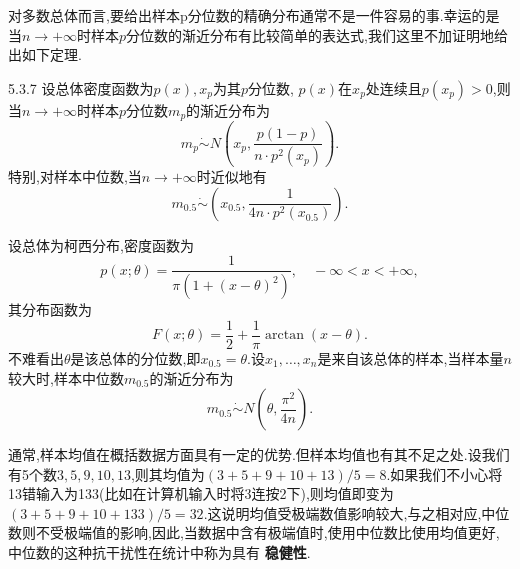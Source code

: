 对多数总体而言,要给出样本p分位数的精确分布通常不是一件容易的事.幸运的是当$n\to+\infty$时样本$p$分位数的渐近分布有比较简单的表达式,我们这里不加证明地给出如下定理.
\begin{theorem}{}{5.3.7}
设总体密度函数为$p(x),x_p$为其$p$分位数, $p(x)$在$x_p$处连续且$p(x_p)>0$,则当$n\to+\infty$时样本$p$分位数$m_p$的渐近分布为
\begin{equation}\label{eq:5.3.17}
m_p\dot{\sim}N\left(x_p,\frac{p(1-p)}{n\cdot p^2(x_p)}\right).
\end{equation}
特别,对样本中位数,当$n\to+\infty$时近似地有
\begin{equation}\label{eq:5.3.18}
m_{0.5}\dot{\sim}\left(x_{0.5},\frac1{4n\cdot p^2(x_{0.5})}\right).
\end{equation}
\end{theorem}
\begin{example}
设总体为柯西分布,密度函数为
\[p(x;\theta)=\frac1{\pi(1+(x-\theta)^2)},\quad -\infty<x<+\infty,\]
其分布函数为
\[F(x;\theta)=\frac12+\frac1\pi\arctan(x-\theta).\]
不难看出$\theta$是该总体的分位数,即$x_{0.5}=\theta$.设$x_1,\dotsc,x_n$是来自该总体的样本,当样本量$n$较大时,样本中位数$m_{0.5}$的渐近分布为
\[m_{0.5}\dot{\sim}N\left(\theta,\frac{\pi^2}{4n}\right).\]
\end{example}
通常,样本均值在概括数据方面具有一定的优势.但样本均值也有其不足之处.设我们有5个数$3,5,9,10,13$,则其均值为$(3+5+9+10+13)/5=8$.如果我们不小心将13错输入为133(比如在计算机输入时将3连按2下),则均值即变为$(3+5+9+10+133)/5=32$.这说明均值受极端数值影响较大,与之相对应,中位数则不受极端值的影响,因此,当数据中含有极端值时,使用中位数比使用均值更好,中位数的这种抗干扰性在统计中称为具有 \textbf{稳健性}.
